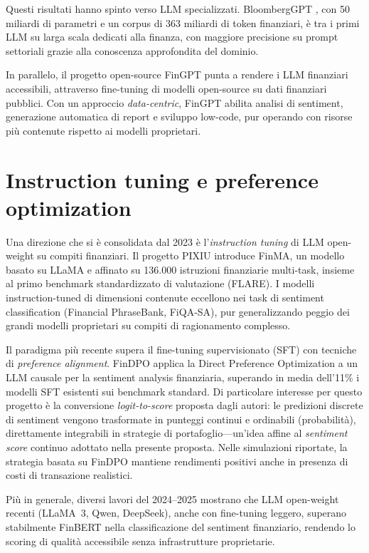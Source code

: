 Questi risultati hanno spinto verso LLM specializzati.
BloombergGPT \parencite{wu2023bloomberggptlargelanguagemodel}, con 50 miliardi di parametri e un corpus di 363 miliardi di token finanziari, è tra i primi LLM su larga scala dedicati alla finanza, con maggiore precisione su prompt settoriali grazie alla conoscenza approfondita del dominio.

In parallelo, il progetto open-source FinGPT \parencite{yang2023fingptopensourcefinanciallarge} punta a rendere i LLM finanziari accessibili, attraverso fine-tuning di modelli open-source su dati finanziari pubblici.
Con un approccio \textit{data-centric}, FinGPT abilita analisi di sentiment, generazione automatica di report e sviluppo low-code, pur operando con risorse più contenute rispetto ai modelli proprietari.

\section{Instruction tuning e preference optimization}

Una direzione che si è consolidata dal 2023 è l'\textit{instruction tuning} di LLM open-weight su compiti finanziari.
Il progetto PIXIU \parencite{xie2023pixiu} introduce FinMA, un modello basato su LLaMA e affinato su 136.000 istruzioni finanziarie multi-task, insieme al primo benchmark standardizzato di valutazione (FLARE).
I modelli instruction-tuned di dimensioni contenute eccellono nei task di sentiment classification (Financial PhraseBank, FiQA-SA), pur generalizzando peggio dei grandi modelli proprietari su compiti di ragionamento complesso.

Il paradigma più recente supera il fine-tuning supervisionato (SFT) con tecniche di \textit{preference alignment}.
FinDPO \parencite{iacovides2025findpo} applica la Direct Preference Optimization a un LLM causale per la sentiment analysis finanziaria, superando in media dell'11\% i modelli SFT esistenti sui benchmark standard.
Di particolare interesse per questo progetto è la conversione \textit{logit-to-score} proposta dagli autori: le predizioni discrete di sentiment vengono trasformate in punteggi continui e ordinabili (probabilità), direttamente integrabili in strategie di portafoglio---un'idea affine al \textit{sentiment score} continuo adottato nella presente proposta.
Nelle simulazioni riportate, la strategia basata su FinDPO mantiene rendimenti positivi anche in presenza di costi di transazione realistici.

Più in generale, diversi lavori del 2024--2025 mostrano che LLM open-weight recenti (LLaMA~3, Qwen, DeepSeek), anche con fine-tuning leggero, superano stabilmente FinBERT nella classificazione del sentiment finanziario, rendendo lo scoring di qualità accessibile senza infrastrutture proprietarie.

